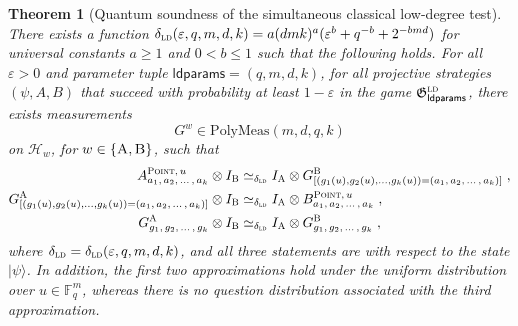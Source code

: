 \documentclass[11pt]{article}
\newtheorem{theorem}{Theorem}[section]
\theoremstyle{definition}
\newcommand{\ket}[1]{|#1\rangle}
\newcommand{\F}{\ensuremath{\mathbb{F}}}
\newcommand{\ld}{\textsc{ld}}
\newcommand{\mH}{\ensuremath{\mathcal{H}}}
\newcommand{\eps}{\varepsilon}
\newcommand{\game}{\mathfrak{G}}
\newcommand{\labelstyle}[1]{\ensuremath{\textsc{#1}}\xspace}
\newcommand{\alice}{\labelstyle{A}}
\newcommand{\bob}{\labelstyle{B}}
\newcommand{\typestyle}[1]{\ensuremath{\textsc{#1}}\xspace}
\newcommand{\Point}{\typestyle{Point}}
\newcommand{\abc}[1][\delta]{\otimes I_\bob \simeq_{#1} I_\alice \otimes}
\newcommand{\ldc}{k}
\newcommand{\ldparams}{\mathsf{ldparams}}
\newcommand{\simulpolymeas}[4]{\mathrm{PolyMeas}(#1,#2,#3, #4)}
\begin{document}
\begin{theorem}[Quantum soundness of the simultaneous classical low-degree test]
  \label{lem:ld-soundness}
  There exists a function $\delta_{\ld}(\eps, q, m, d, \ldc) = a (dm \ldc)^a (\eps^b + q^{-b} + 2^{-bmd})$ for universal constants $a\geq 1$ and $0<b\leq 1$ 
such that the following
  holds.
  For all $\eps > 0$ and parameter tuple $\ldparams = (q, m, d, \ldc)$, for all
  projective strategies $(\psi,A,B)$ that succeed with probability at least
  $1-\eps$ in the game $\game^\ld_\ldparams$, there exists measurements
  \[G^w \in \simulpolymeas{m}{d}{q}{\ldc}\] on $\mH_w$, for
  $w\in\{\alice,\bob\}$, such that
  \begin{equation*}
    \begin{split}
      A^{\Point,\, u}_{a_1,\, a_2,\, \ldots\,,\, a_\ldc}
      & \abc[\delta_{\ld}]
      G^\bob_{[(g_1(u),g_2(u),\ldots,g_\ldc(u)) = (a_1,\, a_2,\, \ldots \,,\, a_\ldc)]}\;,\\
      G^\alice_{[(g_1(u),g_2(u),\ldots,g_\ldc(u)) = (a_1,\, a_2,\, \ldots \,,\, a_\ldc)]}
      & \abc[\delta_{\ld}]
			 B^{\Point,\, u}_{a_1,\, a_2,\, \ldots\,,\, a_\ldc}\;,\\
      G^\alice_{g_1,\, g_2,\, \ldots \,,\, g_\ldc}
      & \abc[\delta_{\ld}]
      G^\bob_{g_1,\, g_2,\, \ldots \,,\, g_\ldc}\;,
    \end{split}
  \end{equation*}
  where $\delta_{\ld} = \delta_{\ld}(\eps, q, m, d, \ldc)$, 
  and all three statements are with respect to the state $\ket{\psi}$.
In addition, the first two approximations hold under the uniform distribution over $u\in \F_q^m$,
	whereas there is no question distribution associated with the third approximation.
\end{theorem}
\end{document}
